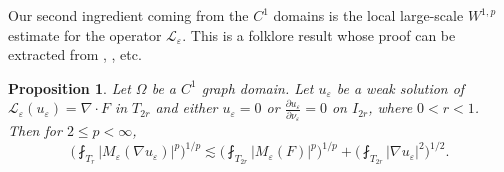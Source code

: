 \documentclass[reqno,12pt]{amsart} %
\newtheorem{proposition}[theorem]{Proposition}
\theoremstyle{definition}
\theoremstyle{remark}
\numberwithin{equation}{section}
\newcommand{\cL}{\mathcal{L}}
\newcommand{\R}{\mathbb{R}}
\newcommand{\e}{\varepsilon}
\begin{document}

Our second ingredient coming from the $C^1$ domains is the local large-scale $W^{1,p}$ estimate for the operator $\cL_\e$. This is a folklore result whose proof can be extracted from \cite[Chapter 4.3]{ShenBook}, \cite[Chapter 7]{AKM19}, etc. 

\begin{proposition}\label{prop.W1p.local}
    Let $\Omega$ be a $C^1$ graph domain.
    Let $u_\e$ be a weak solution of $\cL_\e(u_\e) = \nabla\cdot F$ in $T_{2r}$ and either $u_\e = 0$ or $\frac{\partial u_\e}{\partial \nu_\e} = 0$ on $I_{2r}$, where $0< r< 1$. Then for $2\le p < \infty$,
    \begin{equation}
        \bigg( \fint_{T_r} |M_\e(\nabla u_\e)|^p \bigg)^{1/p} \lesssim \bigg( \fint_{T_{2r}} |M_\e(F)|^p \bigg)^{1/p} + \bigg( \fint_{T_{2r}} |\nabla u_\e|^2 \bigg)^{1/2}.
    \end{equation}   
\end{proposition}
    

\end{document}
